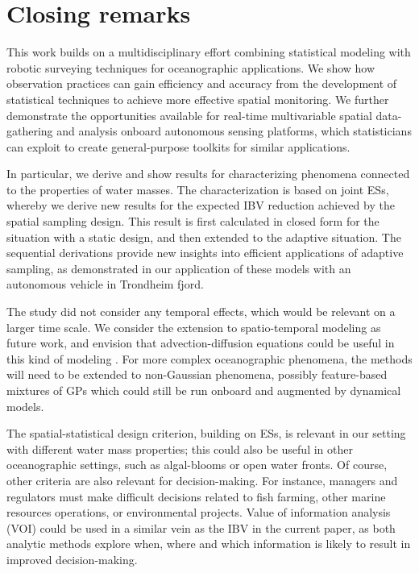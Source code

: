 \documentclass[aoas]{imsart}
\begin{document}

\section{Closing remarks}\label{sec:concl_disc}

This work builds on a multidisciplinary effort combining statistical
modeling with robotic surveying techniques for oceanographic
applications. We show how observation practices can gain efficiency
and accuracy from the development of statistical techniques to achieve
more effective spatial monitoring. We further demonstrate the
opportunities available for real-time multivariable spatial
data-gathering and analysis onboard autonomous sensing platforms,
which statisticians can exploit to create general-purpose toolkits for
similar applications.

In particular, we derive and show results for characterizing phenomena
connected to the properties of water masses. The characterization is
based on joint ESs, whereby we derive new results for the expected IBV
reduction achieved by the spatial sampling design. This result is
first calculated in closed form for the situation with a static
design, and then extended to the adaptive situation. The sequential
derivations provide new insights into efficient applications of
adaptive sampling, as demonstrated in our application of these models
with an autonomous vehicle in Trondheim fjord.

The study did not consider any temporal effects, which would be
relevant on a larger time scale. We consider the extension to
spatio-temporal modeling as future work, and envision that
advection-diffusion equations could be useful in this kind of modeling
\citep{sigrist2015stochastic}. For more complex oceanographic
phenomena, the methods will need to be extended to non-Gaussian
phenomena, possibly feature-based mixtures of GPs which could still be
run onboard and augmented by dynamical models.

The spatial-statistical design criterion, building on ESs, is relevant
in our setting with different water mass properties; this could also
be useful in other oceanographic settings, such as algal-blooms or
open water fronts. Of course, other criteria are also relevant for
decision-making. For instance, managers and regulators must make
difficult decisions related to fish farming, other marine resources
operations, or environmental projects. Value of information analysis
(VOI) \citep{Eidsvik:15} could be used in a similar vein as the IBV in
the current paper, as both analytic methods explore when, where and
which information is likely to result in improved decision-making.
\end{document}
